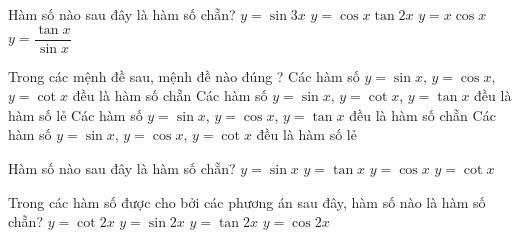 \begin{ex}%
	Hàm số nào  sau đây là hàm số chẵn?
	\choice 
		{$y=\sin 3x$} 
		{$y=\cos  x \tan 2x$}
		{$y=x\cos  x$}
		{\True $y=\dfrac{\tan  x}{\sin x}$}
\end{ex}

\begin{ex}%
	Trong các mệnh đề sau, mệnh đề nào  đúng ?
	\choice 
		{Các hàm số $y=\sin x$, $ y=\cos x$, $y=\cot x$  đều là hàm số chẵn}
		{\True Các hàm số $y=\sin x$, $y=\cot x$, $y=\tan  x$ đều là hàm số lẻ}
		 {Các hàm số $y=\sin x$, $y=\cos x$, $y=\tan x$ đều là hàm số chẵn}
		{Các hàm số $y=\sin x$, $y=\cos x$, $y=\cot x$ đều là hàm số lẻ} 
\end{ex}

\begin{ex}%
	 Hàm số nào sau đây là hàm số chẵn?
	 \choice
		{$y=\sin  x$}
		{$y=\tan x$} 
		{\True $y=\cos  x$}
		 {$y=\cot x$}
\end{ex}

\begin{ex}%
	Trong các  hàm số được cho bởi các phương án sau đây, hàm số nào là hàm số chẵn?
	 \choice
		 {$y=\cot 2x$}
		{$y=\sin  2x$}
		{$y=\tan  2x$}
		{\True $y=\cos  2x$}
\end{ex}

